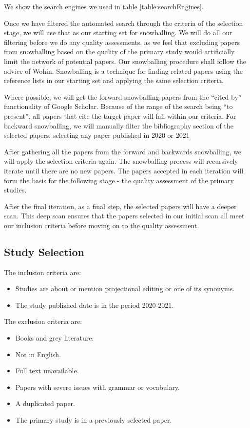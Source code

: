 We show the search engines we used in table \ref{table:searchEngines}.

Once we have filtered the automated search through the criteria of the selection stage, we will use that as our starting set for snowballing.
We will do all our filtering before we do any quality assessments, as we feel that excluding papers from snowballing based on the quality of the primary study would artificially limit the network of potential papers.
Our snowballing procedure shall follow the advice of Wohin\cite{Wohlin_2014}.
Snowballing is a technique for finding related papers using the reference lists in our starting set and applying the same selection criteria.

Where possible, we will get the forward snowballing papers from the ``cited by'' functionality of Google Scholar.
Because of the range of the search being ``to present'', all papers that cite the target paper will fall within our criteria.
For backward snowballing, we will manually filter the bibliography section of the selected papers, selecting any paper published in 2020 or 2021

After gathering all the papers from the forward and backwards snowballing, we will apply the selection criteria again.
The snowballing process will recursively iterate until there are no new papers.
The papers accepted in each iteration will form the basis for the following stage - the quality assessment of the primary studies.

After the final iteration, as a final step, the selected papers will have a deeper scan. 
This deep scan ensures that the papers selected in our initial scan all meet our inclusion criteria before moving on to the quality assessment.

\subsection{Study Selection}

The inclusion criteria are:
\begin{itemize}
    \setlength\itemsep{0em}
    \item Studies are about or mention projectional editing or one of its synonyms.
    \item The study published date is in the period 2020-2021.
\end{itemize}

The exclusion criteria are:
\begin{itemize}
    \setlength\itemsep{0em}
    \item Books and grey literature.
    \item Not in English.
    \item Full text unavailable.
    \item Papers with severe issues with grammar or vocabulary.
    \item A duplicated paper.
    \item The primary study is in a previously selected paper.
\end{itemize}

